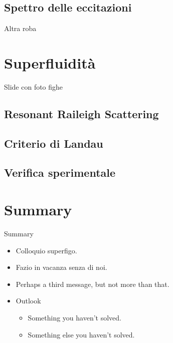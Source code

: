 \documentclass[10pt]{beamer}
\begin{document}
\subsection{Spettro delle eccitazioni}
\begin{frame}{Altra roba}
\end{frame}


\section{Superfluidità}
\begin{frame}{Slide con foto fighe}
 
\end{frame}

\subsection{Resonant Raileigh Scattering}
\subsection{Criterio di Landau}
\subsection{Verifica sperimentale}

\section*{Summary}

\begin{frame}{Summary}
  \begin{itemize}
  \item
    Colloquio \alert{superfigo}.
  \item
    \alert{Fazio in vacanza} senza di noi.
  \item
    Perhaps a \alert{third message}, but not more than that.
  \end{itemize}
  
  \begin{itemize}
  \item
    Outlook
    \begin{itemize}
    \item
      Something you haven't solved.
    \item
      Something else you haven't solved.
    \end{itemize}
  \end{itemize}
\end{frame}
\end{document}
